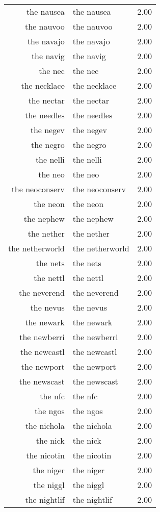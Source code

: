 \begin{table}[ht]
\begin{tabular}{rlr}
  the nausea & the nausea & 2.00 \\ 
  the nauvoo & the nauvoo & 2.00 \\ 
  the navajo & the navajo & 2.00 \\ 
  the navig & the navig & 2.00 \\ 
  the nec & the nec & 2.00 \\ 
  the necklace & the necklace & 2.00 \\ 
  the nectar & the nectar & 2.00 \\ 
  the needles & the needles & 2.00 \\ 
  the negev & the negev & 2.00 \\ 
  the negro & the negro & 2.00 \\ 
  the nelli & the nelli & 2.00 \\ 
  the neo & the neo & 2.00 \\ 
  the neoconserv & the neoconserv & 2.00 \\ 
  the neon & the neon & 2.00 \\ 
  the nephew & the nephew & 2.00 \\ 
  the nether & the nether & 2.00 \\ 
  the netherworld & the netherworld & 2.00 \\ 
  the nets & the nets & 2.00 \\ 
  the nettl & the nettl & 2.00 \\ 
  the neverend & the neverend & 2.00 \\ 
  the nevus & the nevus & 2.00 \\ 
  the newark & the newark & 2.00 \\ 
  the newberri & the newberri & 2.00 \\ 
  the newcastl & the newcastl & 2.00 \\ 
  the newport & the newport & 2.00 \\ 
  the newscast & the newscast & 2.00 \\ 
  the nfc & the nfc & 2.00 \\ 
  the ngos & the ngos & 2.00 \\ 
  the nichola & the nichola & 2.00 \\ 
  the nick & the nick & 2.00 \\ 
  the nicotin & the nicotin & 2.00 \\ 
  the niger & the niger & 2.00 \\ 
  the niggl & the niggl & 2.00 \\ 
  the nightlif & the nightlif & 2.00 \\ 

\end{tabular}
\end{table}
